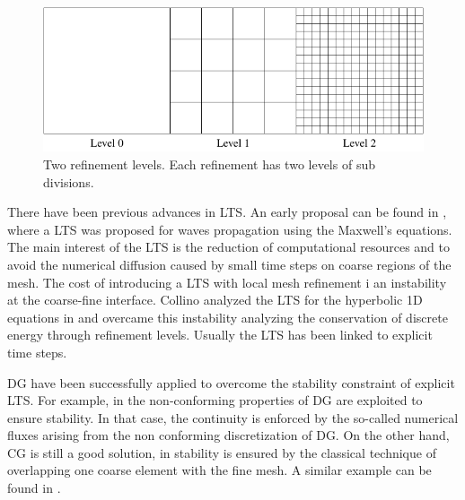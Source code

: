 \begin{figure}
    \centering
    \includegraphics[width=.8\textwidth]{img/multigrid/multilevel_refinement.pdf}
    \caption{Two refinement levels. Each refinement has two levels of sub divisions.}
    \label{multilevel_refinement}
\end{figure}


There have been previous advances in LTS. An early proposal can be found in \cite{chevalier1997}, where a LTS was proposed for waves propagation using the Maxwell's equations. The main interest of the LTS is the reduction of computational resources and to avoid the numerical diffusion caused by small time steps on coarse regions of the mesh. The cost of introducing a LTS with local mesh refinement i an instability at the coarse-fine interface. Collino analyzed the LTS for the hyperbolic 1D equations in \cite{collino2003a,collino2003b} and overcame this instability analyzing the conservation of discrete energy through refinement levels. Usually the LTS has been linked to explicit time steps.

DG have been successfully applied to overcome the stability constraint of explicit LTS. For example, in \cite{diaz2009} the non-conforming properties of DG are exploited to ensure stability. In that case, the continuity is enforced by the so-called numerical fluxes arising from the non conforming discretization of DG. On the other hand, CG is still a good solution, in \cite{almquist2016} stability is ensured by the classical technique of overlapping one coarse element with the fine mesh. A similar example can be found in \cite{grote2021}.

